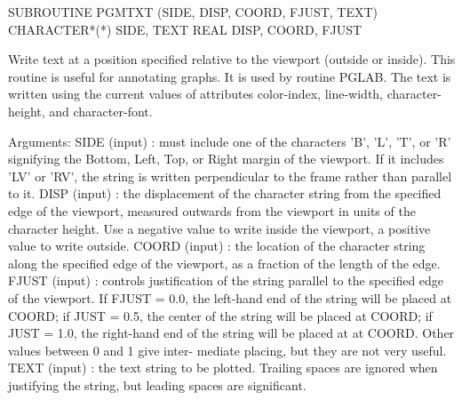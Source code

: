 {\eightpoint\begintt
      SUBROUTINE PGMTXT (SIDE, DISP, COORD, FJUST, TEXT)
      CHARACTER*(*) SIDE, TEXT
      REAL DISP, COORD, FJUST
 
Write text at a position specified relative to the viewport (outside
or inside).  This routine is useful for annotating graphs. It is used
by routine PGLAB.  The text is written using the current values of
attributes color-index, line-width, character-height, and
character-font.
 
Arguments:
 SIDE   (input)  : must include one of the characters 'B', 'L', 'T',
                   or 'R' signifying the Bottom, Left, Top, or Right
                   margin of the viewport. If it includes 'LV' or
                   'RV', the string is written perpendicular to the
                   frame rather than parallel to it.
 DISP   (input)  : the displacement of the character string from the
                   specified edge of the viewport, measured outwards
                   from the viewport in units of the character
                   height. Use a negative value to write inside the
                   viewport, a positive value to write outside.
 COORD  (input)  : the location of the character string along the
                   specified edge of the viewport, as a fraction of
                   the length of the edge.
 FJUST  (input)  : controls justification of the string parallel to
                   the specified edge of the viewport. If
                   FJUST = 0.0, the left-hand end of the string will
                   be placed at COORD; if JUST = 0.5, the center of
                   the string will be placed at COORD; if JUST = 1.0,
                   the right-hand end of the string will be placed at
                   at COORD. Other values between 0 and 1 give inter-
                   mediate placing, but they are not very useful.
 TEXT   (input) :  the text string to be plotted. Trailing spaces are
                   ignored when justifying the string, but leading
                   spaces are significant.
 
\endtt}

